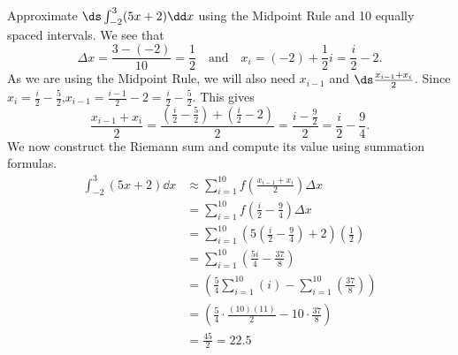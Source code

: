 \begin{example}\label{ex_rie8}%
Approximate $\ds\int_{-2}^3 (5x+2)\dd x$ using the Midpoint Rule and 10 equally spaced intervals.
\solution
We see that %
\[
 \Delta x = \frac{3 - (-2)}{10} = \frac12
 \quad \text{and} \quad
 x_i = (-2) + \frac12 i = \frac i2-2.
\]
As we are using the Midpoint Rule, we will also need $x_{i-1}$ and $\ds \frac{x_{i-1}+x_i}2$. Since $x_i = \frac i2-\frac52$,\quad $x_{i-1} = \frac{i-1}2 - 2 = \frac i2 -\frac52$.  This gives 
\[
 \frac{x_{i-1}+x_i}2 = \frac{(\frac i2-\frac52) + (\frac i2-2)}{2} = \frac{i-\frac92}{2} = \frac i2 - \frac94.
\]
We now construct the Riemann sum and compute its value using summation formulas.
\begin{align*}
	\int_{-2}^3 (5x+2)\dd x
	&\approx \sum_{i=1}^{10} f\left(\frac{x_{i-1}+x_i}{2}\right)\Delta x \\
	&= \sum_{i=1}^{10} f\left(\frac i2 - \frac94\right)\Delta x \\
	&= \sum_{i=1}^{10} \left(5\left(\frac i2-\frac94\right) + 2\right)\left(\frac12\right)\\
	&= \sum_{i=1}^{10}\left(\frac{5i}4 - \frac{37}8\right)\\
	&= \left(\frac54\sum_{i=1}^{10} (i) -
	 \sum_{i=1}^{10}\left(\frac{37}8\right)\right) \\
	&= \left(\frac54\cdot\frac{(10)(11)}2 - 10\cdot\frac{37}8\right)  \\
	&= \frac{45}2 = 22.5
\end{align*}



\end{example}
